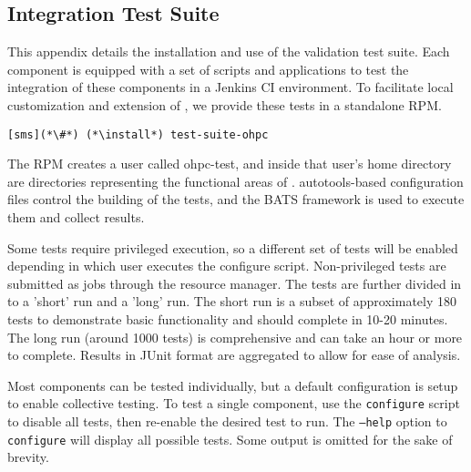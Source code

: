 \subsection{Integration Test Suite}  \label{appendix:test_suite}

This appendix details the installation and use of the \OHPC{} validation test
suite. Each \OHPC{} component is equipped with a set of scripts and applications
to test the integration of these components in a Jenkins CI 
environment. To facilitate local customization and extension of \OHPC{}, we 
provide these tests in a standalone RPM. 

\begin{lstlisting}
[sms](*\#*) (*\install*) test-suite-ohpc
\end{lstlisting}

The RPM creates a user called ohpc-test, and inside that user's home directory 
are directories representing the functional areas of \OHPC{}. \GNU{}
autotools-based configuration files control the building of the tests, and the
BATS framework is used to execute them and collect results. 

Some tests require privileged execution, so a different set of tests will be
enabled depending in which user executes the configure script. Non-privileged
tests are submitted as jobs through the \rms{} resource manager. The tests are
further divided in to a 'short' run and a 'long' run. The short run is a subset
of approximately 180 tests to demonstrate basic functionality and should 
complete in 10-20 minutes. The long run (around 1000 tests) is comprehensive 
and can take an hour or more to complete.  Results in JUnit format are 
aggregated to allow for ease of analysis.

Most components can be tested individually, but a default configuration is setup 
to enable collective testing. To test a single component, use the \texttt{configure}
script to disable all tests, then re-enable the desired test to run. The
\texttt{--help} option to \texttt{configure} will display all possible tests. Some 
output is omitted for the sake of brevity.


